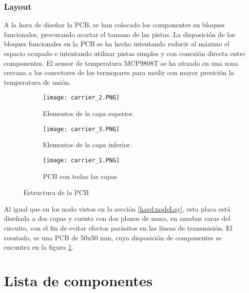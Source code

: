 		\subsubsection{Layout}
		
A la hora de diseñar la PCB, se han colocado los componentes en bloques funcionales, procurando acortar el tamano de las pistas. La disposición de los bloques funcionales en la PCB se  ha hecho intentando reducir al máximo el espacio ocupado e intentando utilizar pistas simples y con conexión directa entre componentes. El sensor de temperatura MCP9808T se ha situado en una zona cercana a los conectores de los termopares para medir con mayor presición la temperatura de unión. 

     	\begin{figure}[htb!]
            \centering
            
            \begin{subfigure}[t]{0.45\textwidth}
                \texttt{[image: carrier\_2.PNG]}
                \caption{Elementos de la capa superior.}
            \end{subfigure}%
            \hfill
            \begin{subfigure}[t]{0.45\textwidth}
                \texttt{[image: carrier\_3.PNG]}
                \caption{Elementos de la capa inferior.}
            \end{subfigure}
            
            \begin{subfigure}[t]{0.5\textwidth}
    			\centering
    			\texttt{[image: carrier\_1.PNG]}
    			\caption{PCB con todas las capas}
    		\end{subfigure}
    		
    		\caption{Estructura de la PCB}
    		\label{fig:PCBcarrier}

        \end{figure}

Al igual que en los nodo vistos en la sección \ref{hard:nodeLay}, esta placa está diseñada a dos capas y cuenta con dos planos de masa, en amabas caras del circuito, con el fin de evitar efectos parásitos en las líneas de transmisión. El resutado, es una PCB de 50x50 mm, cuya disposición de componentes se encuntra en la figura \ref{fig:PCBcarrier}.
		
\section{Lista de componentes}
	
